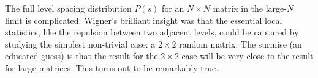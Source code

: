\documentclass[10pt]{article}
\begin{document}

The full level spacing distribution $P(s)$ for an $N \times N$ matrix in the large-$N$ limit is complicated. Wigner's brilliant insight was that the essential local statistics, like the repulsion between two adjacent levels, could be captured by studying the simplest non-trivial case: a $2 \times 2$ random matrix.
The surmise (an educated guess) is that the result for the $2 \times 2$ case will be very close to the result for large matrices. This turns out to be remarkably true.


%
%


\end{document}
